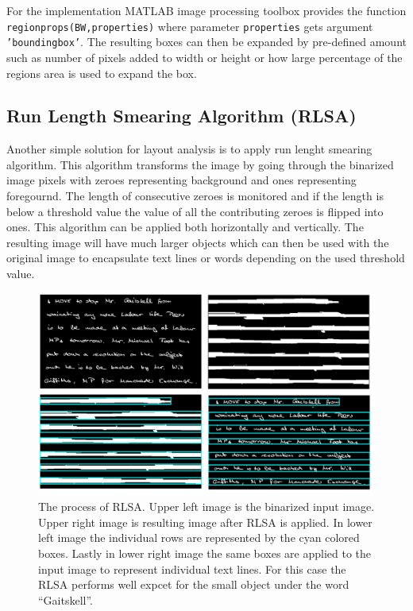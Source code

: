 \documentclass{article}
\def\code#1{\texttt{#1}}
\begin{document}
          For the implementation MATLAB image processing toolbox provides the function \code{regionprops(BW,properties)} where parameter \code{properties} gets argument \code{'boundingbox'}. The resulting boxes can then be expanded by pre-defined amount such as number of pixels added to width or height or how large percentage of the regions area is used to expand the box.

        \subsection{Run Length Smearing Algorithm (RLSA)}
          Another simple solution for layout analysis is to apply run lenght smearing algorithm. This algorithm transforms the image by going through the binarized image pixels with zeroes representing background and ones representing foregournd. The length of consecutive zeroes is monitored and if the length is below a threshold value the value of all the contributing zeroes is flipped into ones. This algorithm can be applied both horizontally and vertically. The resulting image will have much larger objects which can then be used with the original image to encapsulate text lines or words depending on the used threshold value.

          \begin{figure}
            \centering
            \includegraphics[natwidth=1516,natheight=912,scale=0.3]{rlsademo.png}
            \caption{The process of RLSA. Upper left image is the binarized input image. Upper right image is resulting image after RLSA is applied. In lower left image the individual rows are represented by the cyan colored boxes. Lastly in lower right image the same boxes are applied to the input image to represent individual text lines. For this case the RLSA performs well expcet for the small object under the word ``Gaitskell''. \label{fig:workingrlsa} }
          \end{figure}
\end{document}
